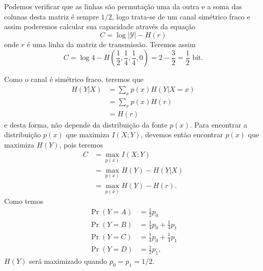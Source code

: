 \begin{questions}
\begin{solution}
\begin{parts}
Podemos verificar que as linhas são permutação uma da outra
e a soma das colunas desta matriz é sempre $1/2$, logo trata-se 
de um canal simétrico fraco e assim poderemos calcular sua capacidade
através da equação
\begin{equation}
C = \log | \mathcal{Y} | - H(r)
\end{equation} 
onde $r$ é uma linha da matriz de transmissão.
Teremos assim
\begin{equation}
C = \log 4 - H\left( \frac{1}{2}, \frac{1}{4}, \frac{1}{4}, 0 \right) = 2 - \frac{3}{2} = \frac{1}{2} \text{ bit}.
\end{equation}

Como o canal é simétrico fraco, teremos que
\begin{align}
H(Y|X) &= \sum_x p(x) H(Y|X=x) \nonumber \\
       &= \sum_x p(x) H(r) \nonumber \\
       &= H(r)
\end{align}
e desta forma, não depende da distribuição da fonte $p(x)$. Para
encontrar a distribuição $p(x)$ que maximiza $I(X;Y)$, devemos então 
encontrar  $p(x)$ que maximiza $H(Y)$, pois teremos
\begin{align}
C &= \max_{p(x)} I(X;Y) \nonumber \\
  &= \max_{p(x)} H(Y) - H(Y|X) \nonumber \\
  &= \max_{p(x)} H(Y) - H(r) .
\end{align}
Como temos
\begin{align}
\Pr(Y=A) &= \frac{1}{2} p_0 \nonumber \\
\Pr(Y=B) &= \frac{1}{4} p_0 + \frac{1}{4} p_1 \nonumber \\
\Pr(Y=C) &= \frac{1}{4} p_0 + \frac{1}{4} p_1 \nonumber \\
\Pr(Y=D) &= \frac{1}{2} p_1 ,
\end{align}
$H(Y)$ será maximizado quando $p_0 = p_1 = 1/2$.


\end{parts}
\end{solution}
\end{questions}
